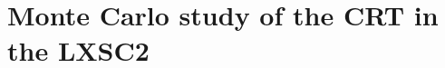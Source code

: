 \documentclass[review]{elsarticle}
\begin{document}
%
%
%
%
%
%
%
%
%
\section{Monte Carlo study of the CRT in the LXSC2} 
\label{sec.CRT}
\end{document}
